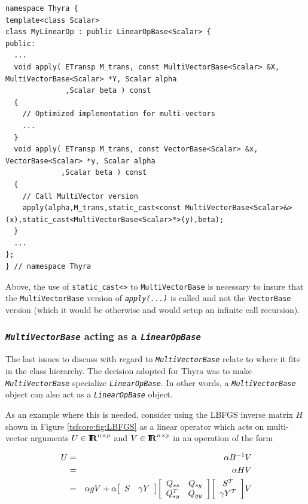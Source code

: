 \documentclass[pdf,ps2pdf,11pt]{SANDreport}
\begin{document}
{\scriptsize\begin{verbatim}
namespace Thyra {
template<class Scalar>
class MyLinearOp : public LinearOpBase<Scalar> {
public:
  ...
  void apply( ETransp M_trans, const MultiVectorBase<Scalar> &X, MultiVectorBase<Scalar> *Y, Scalar alpha
              ,Scalar beta ) const
  {
    // Optimized implementation for multi-vectors
    ...
  }
  void apply( ETransp M_trans, const VectorBase<Scalar> &x, VectorBase<Scalar> *y, Scalar alpha
             ,Scalar beta ) const
  {
    // Call MultiVector version
    apply(alpha,M_trans,static_cast<const MultiVectorBase<Scalar>&>(x),static_cast<MultiVectorBase<Scalar>*>(y),beta);
  }
  ...
};
} // namespace Thyra
\end{verbatim}}

Above, the use of {}\texttt{static\_\-cast<>} to
{}\texttt{Multi\-Vector\-Base} is necessary to insure that the
{}\texttt{Multi\-Vector\-Base} version of {}\texttt{\textit{apply(\-...)}}
is called and not the {}\texttt{Vector\-Base} version (which it would be
otherwise and would setup an infinite call recursion).

%
\subsubsection{\texttt{\textit{Multi\-Vector\-Base}} acting as a {}\texttt{\textit{Linear\-Op\-Base}}}
\label{tsfcore:sec:multi_vec_linear_op}
%

The last issues to discuss with regard to
{}\texttt{\textit{Multi\-Vector\-Base}} relate to where it fits in the class
hierarchy.  The decision adopted for Thyra was to make
{}\texttt{\textit{Multi\-Vector\-Base}} specialize
{}\texttt{\textit{Linear\-Op\-Base}}.  In other words, a
{}\texttt{\textit{Multi\-Vector\-Base}} object can also act as a
{}\texttt{\textit{Linear\-Op\-Base}} object.

As an example where this is needed, consider using the LBFGS inverse
matrix $H$ shown in Figure {}\ref{tsfcore:fig:LBFGS} as a linear
operator which acts on multi-vector arguments $U\in\RE^{n \times p}$
and $V\in\RE^{n \times p}$ in an operation of the form

\begin{eqnarray*}
U & = & \alpha B^{-1} V \\
  & = & \alpha H V \\
  & = & \alpha g V + \alpha
                            {\bmat{cc} S & \gamma Y \emat}
                            {\bmat{cc} Q_{ss} & Q_{sy} \\ Q_{sy}^T & Q_{yy} \emat}
                            {\bmat{c} S^T \\ \gamma Y^T \emat} V
\end{eqnarray*}
\end{document}
